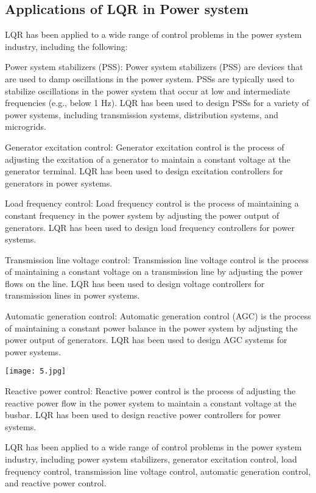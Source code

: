 \documentclass[12pt]{article}
\begin{document}
\subsection*{Applications of LQR in Power system}
LQR has been applied to a wide range of control problems in the power system industry, including the following:

Power system stabilizers (PSS): Power system stabilizers (PSS) are devices that are used to damp oscillations in the power system. PSSs are typically used to stabilize oscillations in the power system that occur at low and intermediate frequencies (e.g., below 1 Hz). LQR has been used to design PSSs for a variety of power systems, including transmission systems, distribution systems, and microgrids.

Generator excitation control: Generator excitation control is the process of adjusting the excitation of a generator to maintain a constant voltage at the generator terminal. LQR has been used to design excitation controllers for generators in power systems.

Load frequency control: Load frequency control is the process of maintaining a constant frequency in the power system by adjusting the power output of generators. LQR has been used to design load frequency controllers for power systems.

Transmission line voltage control: Transmission line voltage control is the process of maintaining a constant voltage on a transmission line by adjusting the power flows on the line. LQR has been used to design voltage controllers for transmission lines in power systems.

Automatic generation control: Automatic generation control (AGC) is the process of maintaining a constant power balance in the power system by adjusting the power output of generators. LQR has been used to design AGC systems for power systems.



\texttt{[image: 5.jpg]}



Reactive power control: Reactive power control is the process of adjusting the reactive power flow in the power system to maintain a constant voltage at the busbar. LQR has been used to design reactive power controllers for power systems.

LQR has been applied to a wide range of control problems in the power system industry, including power system stabilizers, generator excitation control, load frequency control, transmission line voltage control, automatic generation control, and reactive power control.
\end{document}
